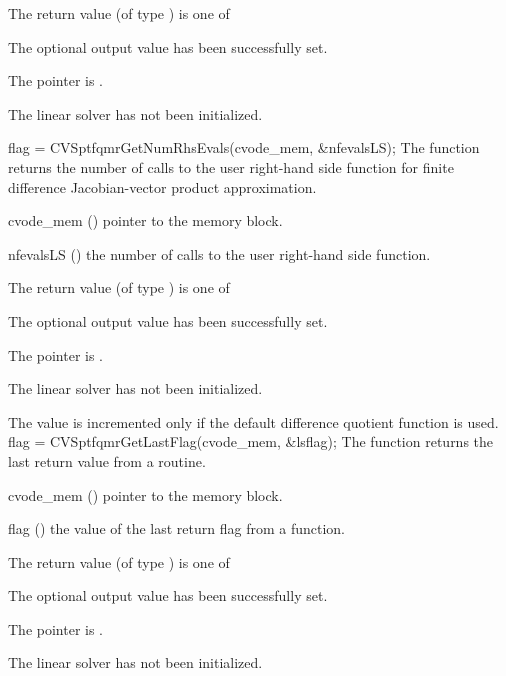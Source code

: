 {
  The return value  (of type ) is one of
  \begin{args}
  \item[\Id{CVSPTFQMR\_SUCCESS}] 
    The optional output value has been successfully set.
  \item[\Id{CVSPTFQMR\_MEM\_NULL}]
    The  pointer is .
  \item[\Id{CVSPTFQMR\_LMEM\_NULL}]
    The {\cvsptfqmr} linear solver has not been initialized.
  \end{args}
}
{}
{
  flag = CVSptfqmrGetNumRhsEvals(cvode\_mem, \&nfevalsLS);
}
{
  The function  returns the
  number of calls to the user right-hand side function for
  finite difference Jacobian-vector product approximation.
}
{
  \begin{args}
  \item[cvode\_mem] ()
    pointer to the {\cvodes} memory block.
  \item[nfevalsLS] ()
    the number of calls to the user right-hand side function.
  \end{args}
}
{
  The return value  (of type ) is one of
  \begin{args}
  \item[\Id{CVSPTFQMR\_SUCCESS}] 
    The optional output value has been successfully set.
  \item[\Id{CVSPTFQMR\_MEM\_NULL}]
    The  pointer is .
  \item[\Id{CVSPTFQMR\_LMEM\_NULL}]
    The {\cvsptfqmr} linear solver has not been initialized.
  \end{args}
}
{
  The value  is incremented only if the default 
   difference quotient function is used.
}
{
  flag = CVSptfqmrGetLastFlag(cvode\_mem, \&lsflag);
}
{
  The function  returns the
  last return value from a {\cvsptfqmr} routine. 
}
{
  \begin{args}
  \item[cvode\_mem] ()
    pointer to the {\cvodes} memory block.
  \item[flag] ()
    the value of the last return flag from a {\cvsptfqmr} function.
  \end{args}
}
{
  The return value  (of type ) is one of
  \begin{args}
  \item[\Id{CVSPTFQMR\_SUCCESS}] 
    The optional output value has been successfully set.
  \item[\Id{CVSPTFQMR\_MEM\_NULL}]
    The  pointer is .
  \item[\Id{CVSPTFQMR\_LMEM\_NULL}]
    The {\cvsptfqmr} linear solver has not been initialized.
  \end{args}
}

